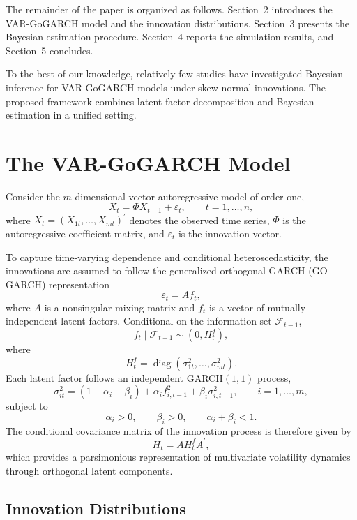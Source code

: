 \documentclass[twoside]{article}
\begin{document}
The remainder of the paper is organized as follows. Section~2 introduces the VAR-GoGARCH model and the innovation distributions. Section~3 presents the Bayesian estimation procedure. Section~4 reports the simulation results, and Section~5 concludes.

To the best of our knowledge, relatively few studies have investigated Bayesian inference for VAR-GoGARCH models under skew-normal innovations. The proposed framework combines latent-factor decomposition and Bayesian estimation in a unified setting.

\section{The VAR-GoGARCH Model}

Consider the $m$-dimensional vector autoregressive model of order one,
\begin{equation}
X_t=\Phi X_{t-1}+\varepsilon_t,
\qquad t=1,\ldots,n,
\end{equation}
where $X_t=(X_{1t},\ldots,X_{mt})^\prime$ denotes the observed time series, $\Phi$ is the autoregressive coefficient matrix, and $\varepsilon_t$ is the innovation vector.

To capture time-varying dependence and conditional heteroscedasticity, the innovations are assumed to follow the generalized orthogonal GARCH (GO-GARCH) representation
\begin{equation}
\varepsilon_t=A f_t,
\end{equation}
where $A$ is a nonsingular mixing matrix and $f_t$ is a vector of mutually independent latent factors. Conditional on the information set $\mathcal{F}_{t-1}$,
\[
f_t \mid \mathcal{F}_{t-1}
\sim
(0,H_t^f),
\]
where
\[
H_t^f
=
\operatorname{diag}
(\sigma_{1t}^2,\ldots,\sigma_{mt}^2).
\]
Each latent factor follows an independent GARCH$(1,1)$ process,
\begin{equation}
\sigma_{it}^{2}
=
(1-\alpha_i-\beta_i)
+
\alpha_i f_{i,t-1}^{2}
+
\beta_i\sigma_{i,t-1}^{2},
\qquad
i=1,\ldots,m,
\end{equation}
subject to
\[
\alpha_i>0,
\qquad
\beta_i>0,
\qquad
\alpha_i+\beta_i<1.
\]
The conditional covariance matrix of the innovation process is therefore given by
\begin{equation}
H_t
=
AH_t^{f}A^{\prime},
\end{equation}
which provides a parsimonious representation of multivariate volatility dynamics through orthogonal latent components.

\subsection{Innovation Distributions}
\end{document}
